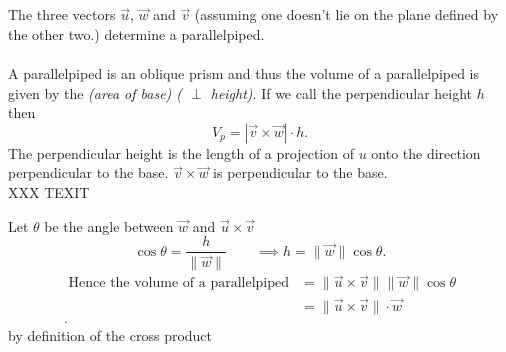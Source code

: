\documentclass{report}
\begin{document}
\\
\clearpage
\\
The three vectors  $\vec{u} $, $\vec{w} $ and $\vec{v} $ (assuming one doesn't lie on the plane defined by the other two.) determine a parallelpiped. \\
\\
A parallelpiped is an oblique prism and thus
the volume of a parallelpiped is given by the \textit{(area of base) ( $\perp$ height)}. If we call the perpendicular height $h$ then
\[
V_p = | \vec{v} \times \vec{w} | \cdot h
.\] 
The perpendicular height is the length of a projection of $u$ onto the direction perpendicular to the base. $\vec{v} \times \vec{w} $ is perpendicular to the base.\\
XXX TEXIT\\ 
  


\raggedcolumns
\begin{multicols}{2}


\break


Let $ \theta $ be the angle between $ \vec{ w} $ and $ \vec{ u} \times \vec{ v}  $  \\
\[
\cos \theta = \frac{ h  }{ \| \vec{ w} \| } \qquad \implies h = \| \vec{ w} \| \cos \theta
.\] 
\begin{align*}
  \text{ Hence the volume of a parallelpiped} &= \| \vec{ u} \times  \vec{ v} \|  \| \vec{ w} \| \cos \theta\\
  &= \| \vec{ u} \times  \vec{ v} \| \cdot \vec{ w} \\
.\end{align*}
by definition of the cross product
\end{multicols}


\end{document}
